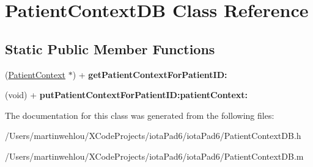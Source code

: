 \hypertarget{interface_patient_context_d_b}{
\section{PatientContextDB Class Reference}
\label{interface_patient_context_d_b}
}
\subsection*{Static Public Member Functions}
\begin{DoxyCompactItemize}
\item 
\hypertarget{interface_patient_context_d_b_a97e28ba4855a30897da534b3a9b138d0}{
(\hyperlink{interface_patient_context}{PatientContext} $\ast$) + {\bfseries getPatientContextForPatientID:}}
\label{interface_patient_context_d_b_a97e28ba4855a30897da534b3a9b138d0}

\item 
\hypertarget{interface_patient_context_d_b_abbe31eafdc74805d470ec7881533591e}{
(void) + {\bfseries putPatientContextForPatientID:patientContext:}}
\label{interface_patient_context_d_b_abbe31eafdc74805d470ec7881533591e}

\end{DoxyCompactItemize}


The documentation for this class was generated from the following files:\begin{DoxyCompactItemize}
\item 
/Users/martinwehlou/XCodeProjects/iotaPad6/iotaPad6/PatientContextDB.h\item 
/Users/martinwehlou/XCodeProjects/iotaPad6/iotaPad6/PatientContextDB.m\end{DoxyCompactItemize}
